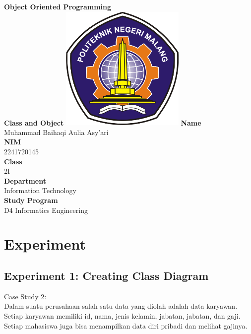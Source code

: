 \documentclass[12pt,titlepage]{article}
\newcommand{\vSubject}{Object Oriented Programming}
\newcommand{\vSubtitle}{Class and Object}
\newcommand{\vName}{Muhammad Baihaqi Aulia Asy'ari}
\newcommand{\vNIM}{2241720145}
\newcommand{\vClass}{2I}
\newcommand{\vDepartment}{Information Technology}
\newcommand{\vStudyProgram}{D4 Informatics Engineering}
\begin{document}
\begin{titlepage}
    \centering
    \vfill
    {\bfseries\LARGE
        \vSubject\\
        \vskip0.25cm
        \vSubtitle
    }
    \vfill
    \includegraphics[width=6cm]{images/polinema-logo.png}
    \vfill
    {
        \textbf{Name}\\
        \vName\\
        \vskip0.5cm
        \textbf{NIM}\\
        \vNIM\\
        \vskip0.5cm
        \textbf{Class}\\
        \vClass\\
        \vskip0.5cm
        \textbf{Department}\\
        \vDepartment\\
        \vskip0.5cm
        \textbf{Study Program}\\
        \vStudyProgram
    }
\end{titlepage}

\newpage

\setcounter{section}{3}

\section{Experiment}

\subsection{Experiment 1: Creating Class Diagram}
Case Study 2: \\

Dalam suatu perusahaan salah satu data yang diolah adalah data karyawan. Setiap karyawan memiliki id, nama, jenis kelamin, jabatan, jabatan, dan gaji. Setiap mahasiswa juga bisa menampilkan data diri pribadi dan melihat gajinya. \\
\end{document}
